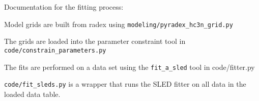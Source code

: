 Documentation for the fitting process:

Model grids are built from radex using \texttt{modeling/pyradex\_hc3n\_grid.py}

The grids are loaded into the parameter constraint tool in \texttt{code/constrain\_parameters.py}

The fits are performed on a data set using the \texttt{fit\_a\_sled} tool in code/fitter.py

\texttt{code/fit\_sleds.py} is a wrapper that runs the SLED fitter on all data in the loaded data table.
